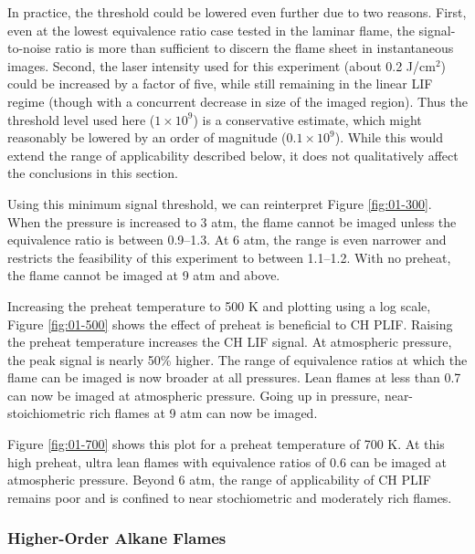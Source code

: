 


In practice, the threshold could be lowered even further due to two reasons.
First, even at the lowest equivalence ratio case tested in the laminar flame, the signal-to-noise ratio is more than sufficient to discern the flame sheet in instantaneous images.
Second, the laser intensity used for this experiment (about 0.2 J/cm\(^2\)) could be increased by a factor of five, while still remaining in the linear LIF regime (though with a concurrent decrease in size of the imaged region).
Thus the threshold level used here (\(1\times10^9\)) is a conservative estimate, which might reasonably be lowered by an order of magnitude (\(0.1\times10^9\)). While this would extend the range of applicability described below, it does not qualitatively affect the conclusions in this section.

Using this minimum signal threshold, we can reinterpret Figure \ref{fig:01-300}.
When the pressure is increased to 3 atm, the flame cannot be imaged unless the equivalence ratio is between 0.9--1.3.
At 6 atm, the range is even narrower and restricts the feasibility of this experiment to between 1.1--1.2.
With no preheat, the flame cannot be imaged at 9 atm and above.

Increasing the preheat temperature to 500 K and plotting using a log scale, Figure \ref{fig:01-500} shows the effect of preheat is beneficial to CH PLIF.
Raising the preheat temperature increases the CH LIF signal.
At atmospheric pressure, the peak signal is nearly 50\% higher.
The range of equivalence ratios at which the flame can be imaged is now broader at all pressures.
Lean flames at less than 0.7 can now be imaged at atmospheric pressure.
Going up in pressure, near-stoichiometric rich flames at 9 atm can now be imaged.



Figure \ref{fig:01-700} shows this plot for a preheat temperature of 700 K.
At this high preheat, ultra lean flames with equivalence ratios of 0.6 can be imaged at atmospheric pressure.
Beyond 6 atm, the range of applicability of CH PLIF remains poor and is confined to near stochiometric and moderately rich flames.



\subsubsection{Higher-Order Alkane Flames}
\label{subsubsec:unstrained-higher-alkanes}

